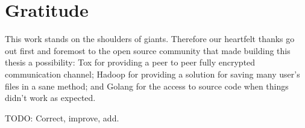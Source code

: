 \section*{Gratitude}
\label{chap:gratitude}

This work stands on the shoulders of giants.
Therefore our heartfelt thanks go out first and foremost to the open source community that made building this thesis a possibility: Tox for providing a peer to peer fully encrypted communication channel; Hadoop for providing a solution for saving many user's files in a sane method; and Golang for the access to source code when things didn't work as expected.

TODO: Correct, improve, add.
